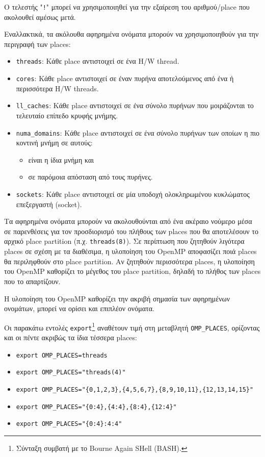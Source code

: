 Ο τελεστής "\texttt{!}" μπορεί να χρησιμοποιηθεί για την εξαίρεση του αριθμού/place που ακολουθεί αμέσως μετά.

\noindent Εναλλακτικά, τα ακόλουθα αφηρημένα ονόματα μπορούν να χρησιμοποιηθούν για την περιγραφή των places:
\begin{itemize}
	\item \texttt{threads}: Κάθε place αντιστοιχεί σε ένα H/W thread.
	\item \texttt{cores}: Κάθε place αντιστοιχεί σε έναν πυρήνα αποτελούμενος από ένα ή περισσότερα H/W threads.
	\item \texttt{ll\_caches}: Κάθε place αντιστοιχεί σε ένα σύνολο πυρήνων που μοιράζονται το τελευταίο επίπεδο κρυφής μνήμης.
	\item \texttt{numa\_domains}: Κάθε place αντιστοιχεί σε ένα σύνολο πυρήνων των οποίων η πιο κοντινή μνήμη σε αυτούς:
	\begin{itemize}
		\item είναι η ίδια μνήμη και %
		\item σε παρόμοια απόσταση από τους πυρήνες.
	\end{itemize}
	\item \texttt{sockets}: Κάθε place αντιστοιχεί σε μία υποδοχή ολοκληρωμένου κυκλώματος επεξεργαστή (socket).
\end{itemize}

Τα αφηρημένα ονόματα μπορούν να ακολουθούνται από ένα ακέραιο νούμερο μέσα σε παρενθέσεις για τον προσδιορισμό του πλήθους των places που θα αποτελέσουν το αρχικό place partition (π.χ. \texttt{threads(8)}). Σε περίπτωση που ζητηθούν λιγότερα places σε σχέση με τα διαθέσιμα, η υλοποίηση του OpenMP αποφασίζει ποιά places θα περιληφθούν στο place partition. Αν ζητηθούν περισσότερα places, η υλοποίηση του OpenMP καθορίζει το μέγεθος του place partition, δηλαδή το πλήθος των places που το απαρτίζουν.

Η υλοποίηση του OpenMP καθορίζει την ακριβή σημασία των αφηρημένων ονομάτων, μπορεί να ορίσει και επιπλέον ονόματα.

Οι παρακάτω εντολές \texttt{export}\footnote{Σύνταξη συμβατή με το Bourne Again SHell (BASH).} αναθέτουν τιμή στη μεταβλητή \texttt{OMP\_PLACES}, ορίζοντας και οι πέντε ακριβώς τα ίδια τέσσερα places:
\begin{itemize}
	\item \texttt{export OMP\_PLACES=threads}
	\item \texttt{export OMP\_PLACES="threads(4)"}
	\item \texttt{export OMP\_PLACES="\{0,1,2,3\},\{4,5,6,7\},\{8,9,10,11\},\{12,13,14,15\}"}
	\item \texttt{export OMP\_PLACES="\{0:4\},\{4:4\},\{8:4\},\{12:4\}"}
	\item \texttt{export OMP\_PLACES="\{0:4\}:4:4"}
\end{itemize}


